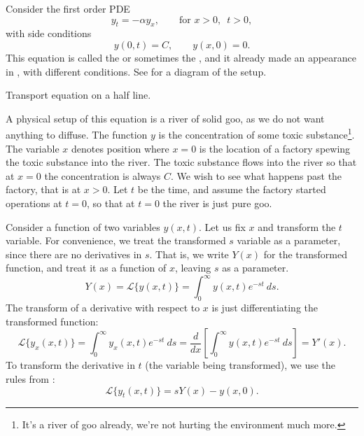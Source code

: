 \begin{example}
Consider the first order PDE
\begin{equation*}
y_t = - \alpha y_x, \qquad \text{for } x > 0, \enspace t > 0,
\end{equation*}
with side conditions
\begin{equation*}
y(0,t) = C, \qquad y(x,0) = 0 .
\end{equation*}
This equation is 
called the \emph{} or sometimes
the \emph{}, and it already made
an appearance in , with different conditions.
See  for a diagram of the setup.

\begin{mywrapfig}{3.1in}
\capstart
{}
\caption{Transport equation on a half line.\label{lt:half-infinite-goo-river}}
\end{mywrapfig}

A physical setup of this equation is a river of solid goo,
as we do not want anything to diffuse.  The function
$y$ is the concentration of
some toxic substance\footnote{It's a river of goo already,
we're not hurting the environment much more.}.
The variable $x$ denotes position where $x=0$
is the location of a factory spewing the toxic substance into the
river.  The toxic substance flows into the river so that at $x=0$ the
concentration is always $C$.  We wish to see what happens past the factory,
that is at $x > 0$.  Let $t$ be the time, and assume
the factory started operations at $t=0$, so that at $t=0$ the river is just
pure goo.

Consider a function of two variables $y(x,t)$.
Let us fix $x$ and transform the $t$ variable.
For convenience, we treat the transformed $s$
variable as a parameter, since there are no derivatives in $s$.
That is, we write $Y(x)$ for the transformed function,
and treat it as a function of $x$, leaving $s$ as a parameter.
\begin{equation*}
Y(x)
= {\mathcal L} \bigl\{ y(x,t) \bigr\}
= \int_0^\infty y(x,t) e^{-st} ~ds .
\end{equation*}
The transform of a derivative with respect to $x$ is just differentiating 
the transformed function:
\begin{equation*}
{\mathcal L} \bigl\{ y_x(x,t) \bigr\} =
\int_0^\infty y_x(x,t) e^{-st} ~ds
=
\frac{d}{dx} \left[\int_0^\infty y(x,t) e^{-st} ~ds \right]
=
Y'(x) .
\end{equation*}
To transform the derivative in $t$ (the variable being transformed),
we use the rules from :
\begin{equation*}
{\mathcal L} \bigl\{ y_t(x,t) \bigr\} 
=
sY(x) - y(x,0) .
\end{equation*}


\end{example}
